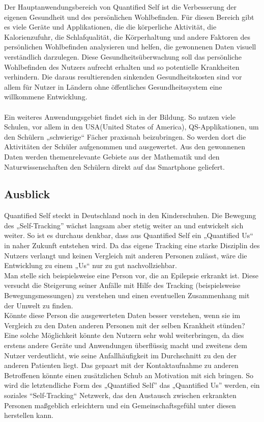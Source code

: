 Der Hauptanwendungsbereich von Quantified Self ist die Verbesserung der eigenen Gesundheit und des persönlichen Wohlbefinden. 
Für diesen Bereich gibt es viele Geräte und Applikationen, die die körperliche Aktivität, die Kalorienzufuhr, die Schlafqualität, die Körperhaltung und andere Faktoren des persönlichen Wohlbefinden analysieren und helfen, die gewonnenen Daten visuell verständlich darzulegen. 
Diese Gesundheitsüberwachung soll das persönliche Wohlbefinden des Nutzers aufrecht erhalten und so potentielle Krankheiten verhindern.
Die daraus resultierenden sinkenden Gesundheitskosten sind vor allem für Nutzer in Ländern ohne öffentliches Gesundheitssystem eine willkommene Entwicklung.
\\
\\
Ein weiteres Anwendungsgebiet findet sich in der Bildung. 
So nutzen viele Schulen, vor allem in den USA(United States of America), QS-Applikationen, um den Schülern „schwierige“ Fächer praxisnah beizubringen. 
So werden dort die Aktivitäten der Schüler aufgenommen und ausgewertet.
Aus den gewonnenen Daten werden themenrelevante Gebiete aus der Mathematik und den Naturwissenschaften den Schülern direkt auf das Smartphone geliefert\cite{web:QSEducation}.


\subsection{Ausblick}
\label{ch:Grundlagen:sec:QuantifiedSelf:subsec:Ausblick}

Quantified Self steckt in Deutschland noch in den Kinderschuhen.
Die Bewegung des „Self-Tracking” wächst langsam aber stetig weiter an und entwickelt sich weiter.
So ist es durchaus denkbar, dass aus Quantified Self ein „Quantified Us“ in naher Zukunft entstehen wird.
Da das eigene Tracking eine starke Disziplin des Nutzers verlangt und keinen Vergleich mit anderen Personen zulässt, wäre die Entwicklung zu einem „Us“ nur zu gut nachvollziehbar.
\\
Man stelle sich beispielsweise eine Person vor, die an Epilepsie erkrankt ist. 
Diese versucht die Steigerung seiner Anfälle mit Hilfe des Tracking (beispielsweise Bewegungsmessungen) zu verstehen und einen eventuellen Zusammenhang mit der Umwelt zu finden. \\	
Könnte diese Person die ausgewerteten Daten besser verstehen, wenn sie im Vergleich zu den Daten anderen Personen mit der selben Krankheit stünden? \\
Eine solche Möglichkeit könnte den Nutzern sehr wohl weiterbringen, da dies erstens andere Geräte und Anwendungen überflüssig macht und zweitens dem Nutzer verdeutlicht, wie seine Anfallhäufigkeit im Durchschnitt zu den der anderen Patienten liegt.
Das gepaart mit der Kontaktaufnahme zu anderen Betroffenen könnte einen zusätzlichen Schub an Motivation mit sich bringen. 
So wird die letztendliche Form des „Quantified Self” das „Quantified Us” werden, ein soziales “Self-Tracking“ Netzwerk, das den Austausch zwischen erkrankten Personen maßgeblich erleichtern und ein Gemeinschaftsgefühl unter diesen herstellen kann.

